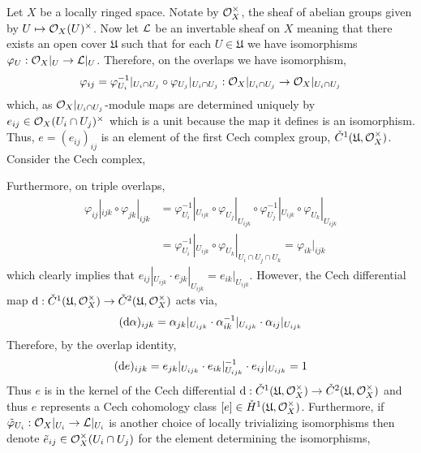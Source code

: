 \documentclass[12pt]{article}
\begin{document}
Let $X$ be a locally ringed space. Notate by $\mathcal{O}_{X}^\times$, the sheaf of abelian groups given by $U \mapsto \mathcal{O}_{X}(U)^\times$. Now let $\mathcal{L}$ be an invertable sheaf on $X$ meaning that there exists an open cover $\mathfrak{U}$ such that for each $U \in \mathfrak{U}$ we have isomorphisms $\varphi_U : \mathcal{O}_{X}|_U \to \mathcal{L}|_U$. Therefore, on the overlaps we have isomorphism,
\[ \varphi_{ij} = \varphi_{U_i}^{-1}|_{U_i \cap U_j} \circ \varphi_{U_j} |_{U_i \cap U_j} : \mathcal{O}_{X} |_{U_i \cap U_j} \to \mathcal{O}_{X} |_{U_i \cap U_j} \]
which, as $\mathcal{O}_{X}|_{U_i \cap U_j}$-module maps are determined uniquely by $e_{ij} \in \mathcal{O}_{X}(U_i \cap U_j)^\times$ which is a unit because the map it defines is an isomorphism. Thus, $e = (e_{ij})_{ij}$ is an element of the first Cech complex group, $\check{C}^1(\mathfrak{U}, \mathcal{O}_{X}^\times)$. Consider the Cech complex,
\begin{center}
\end{center}
Furthermore, on triple overlaps,
\begin{align*}
\varphi_{ij}|_{ijk} \circ \varphi_{jk}|_{ijk} & = \varphi_{U_i}^{-1}|_{U_{ijk}} \circ \varphi_{U_j} |_{U_{ijk}} \circ \varphi_{U_j}^{-1}|_{U_{ijk}} \circ \varphi_{U_k} |_{U_{ijk}} 
\\
& = \varphi_{U_i}^{-1}|_{U_{ijk}} \circ \varphi_{U_k} |_{U_i \cap U_j \cap U_k} = \varphi_{ik} |_{ijk} 
\end{align*}
which clearly implies that $e_{ij} |_{U_{ijk}} \cdot e_{jk} |_{U_{ijk}} = e_{ik} |_{U_{ijk}}$. However, the Cech differential map $\mathrm{d} : \check{C}^1(\mathfrak{U}, \mathcal{O}_{X}^\times) \to \check{C}^2(\mathfrak{U}, \mathcal{O}_{X}^\times)$ acts via,
\[ (\mathrm{d}{\alpha})_{ijk} = \alpha_{jk} |_{U_{ijk}} \cdot \alpha_{ik}^{-1} |_{U_{ijk}} \cdot \alpha_{ij} |_{U_{ijk}} \]
Therefore, by the overlap identity,
\[ (\mathrm{d}{e})_{ijk} = e_{jk}|_{U_{ijk}} \cdot e_{ik}|_{U_{ijk}}^{-1} \cdot e_{ij} |_{U_{ijk}} = 1 \]
Thus $e$ is in the kernel of the Cech differential $\mathrm{d} : \check{C}^1(\mathfrak{U}, \mathcal{O}_{X}^\times) \to \check{C}^2(\mathfrak{U}, \mathcal{O}_{X}^\times)$ and thus $e$ represents a Cech cohomology class $[e] \in \check{H}^1(\mathfrak{U}, \mathcal{O}_{X}^\times)$. Furthermore, if $\tilde{\varphi}_{U_i} : \mathcal{O}_{X} |_{U_i} \to \mathcal{L} |_{U_i}$ is another choice of locally trivializing isomorphisms then denote $\tilde{e}_{ij} \in \mathcal{O}_{X}^\times(U_i \cap U_j)$ for the element determining the isomorphisms,
\end{document}
